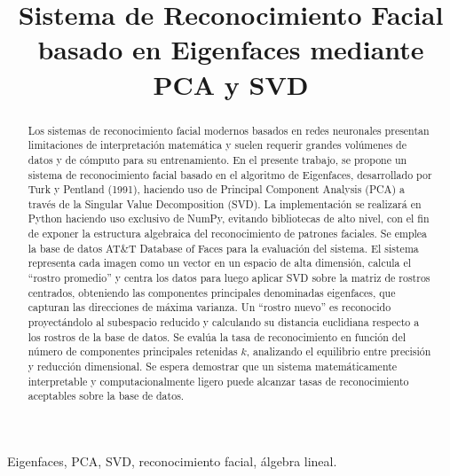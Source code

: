 \documentclass[conference]{IEEEtran}
\title{Sistema de Reconocimiento Facial basado en Eigenfaces mediante PCA y SVD}
\author{
    \IEEEauthorblockN{Ipanaqué Torres, Jesús Andrés}
    \IEEEauthorblockA{
        Facultad de Ciencias\\
        Universidad Nacional de Ingeniería\\
        Lima, Perú
    }
}
\begin{document}
\maketitle

\begin{abstract}
Los sistemas de reconocimiento facial modernos basados en redes neuronales presentan
limitaciones de interpretación matemática y suelen requerir grandes volúmenes de datos
y de cómputo para su entrenamiento.
En el presente trabajo, se propone un sistema de reconocimiento facial basado en el algoritmo 
de Eigenfaces, desarrollado por Turk y Pentland (1991), haciendo uso de Principal Component 
Analysis (PCA) a través de la Singular Value Decomposition (SVD).
La implementación se realizará en Python haciendo uso exclusivo de NumPy, evitando bibliotecas 
de alto nivel, con el fin de exponer la estructura algebraica del reconocimiento de patrones faciales.
Se emplea la base de datos AT\&T Database of Faces para la evaluación del sistema.
El sistema representa cada imagen como un vector en un espacio de alta dimensión, 
calcula el ``rostro promedio'' y centra los datos para luego aplicar SVD sobre la 
matriz de rostros centrados, obteniendo las componentes principales denominadas eigenfaces, 
que capturan las direcciones de máxima varianza.
Un ``rostro nuevo'' es reconocido proyectándolo al subespacio reducido y calculando 
su distancia euclidiana respecto a los rostros de la base de datos.
Se evalúa la tasa de reconocimiento en función del número de componentes principales 
retenidas $k$, analizando el equilibrio entre precisión y reducción dimensional.
Se espera demostrar que un sistema matemáticamente interpretable y computacionalmente 
ligero puede alcanzar tasas de reconocimiento aceptables sobre la base de datos.
\end{abstract}

\begin{IEEEkeywords}
Eigenfaces, PCA, SVD, reconocimiento facial, álgebra lineal.
\end{IEEEkeywords}







\end{document}

